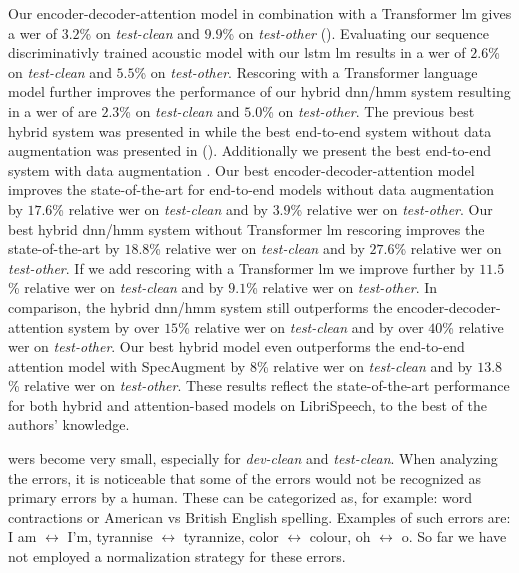 \documentclass[a4paper]{article}
\begin{document}
Our encoder-decoder-attention model in combination with a Transformer \ac{lm} gives a \ac{wer} of $3.2$\% on \emph{test-clean} and $9.9$\% on \emph{test-other} ().
Evaluating our sequence discriminativly trained acoustic model with our \ac{lstm} \ac{lm} results in a \ac{wer} of $2.6$\% on \emph{test-clean} and $5.5$\% on \emph{test-other}.
Rescoring with a Transformer language model further improves the performance of our hybrid \ac{dnn}/\ac{hmm} system
resulting in a \ac{wer} of are $2.3$\% on \emph{test-clean} and $5.0$\% on \emph{test-other}.
The previous best hybrid system was presented in \cite{han2017:capio} while the best end-to-end system without data augmentation was presented in \cite{zeghidour2018:fully,irie2019} ().
Additionally we present the best end-to-end system with data augmentation \cite{park2019specaugment}.
Our best encoder-decoder-attention model improves the state-of-the-art for end-to-end models without data augmentation by $17.6$\% relative \ac{wer} on \emph{test-clean} and by $3.9$\% relative \ac{wer} on \emph{test-other}.
Our best hybrid \ac{dnn}/\ac{hmm} system without Transformer \ac{lm} rescoring improves the state-of-the-art by $18.8$\% relative \ac{wer} on \emph{test-clean} and by $27.6$\% relative \ac{wer} on \emph{test-other}.
If we add rescoring with a Transformer \ac{lm} we improve further by $11.5$\% relative \ac{wer} on \emph{test-clean} and by $9.1$\% relative \ac{wer} on \emph{test-other}.
In comparison, the hybrid \ac{dnn}/\ac{hmm} system still outperforms the encoder-decoder-attention system by over $15$\% relative \ac{wer} on \emph{test-clean} and by over $40$\% relative \ac{wer} on \emph{test-other}.
Our best hybrid model even outperforms the end-to-end attention model with SpecAugment \cite{park2019specaugment} by $8$\% relative \ac{wer} on \emph{test-clean} and by $13.8$\% relative \ac{wer} on \emph{test-other}.
These results reflect the state-of-the-art performance for both hybrid and attention-based models on LibriSpeech, to the best of the authors' knowledge.

\acp{wer} become very small, especially for \emph{dev-clean} and \emph{test-clean}.
When analyzing the errors, it is noticeable that some of the errors would not be recognized as primary errors by a human.
These can be categorized as, for example: word contractions or American vs British English spelling.
Examples of such errors are: I am $\leftrightarrow$ I'm, tyrannise $\leftrightarrow$ tyrannize, color $\leftrightarrow$ colour, oh $\leftrightarrow$ o.
So far we have not employed a normalization strategy for these errors.
\end{document}
